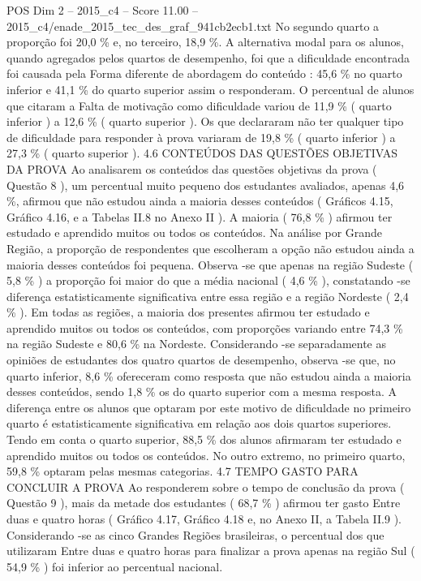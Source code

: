 \begin{textsample}{POS Dim 2 – 2015\_c4 – Score 11.00 – 2015\_c4/enade\_2015\_tec\_des\_graf\_941cb2ecb1.txt}
No segundo quarto a proporção foi 20,0 \% e, no terceiro, 18,9 \%.
A alternativa modal para os alunos, quando agregados pelos quartos de desempenho, foi que a dificuldade encontrada foi causada pela Forma diferente de abordagem do conteúdo : 45,6 \% no quarto inferior e 41,1 \% do quarto superior assim o responderam.
O percentual de alunos que citaram a Falta de motivação como dificuldade variou de 11,9 \% ( quarto inferior ) a 12,6 \% ( quarto superior ).
Os que declararam não ter qualquer tipo de dificuldade para responder à prova variaram de 19,8 \% ( quarto inferior ) a 27,3 \% ( quarto superior ). 4.6 CONTEÚDOS DAS QUESTÕES OBJETIVAS DA PROVA Ao analisarem os conteúdos das questões objetivas da prova ( Questão 8 ), um percentual muito pequeno dos estudantes avaliados, apenas 4,6 \%, afirmou que não estudou ainda a maioria desses conteúdos ( Gráficos 4.15, Gráfico 4.16, e a Tabelas II.8 no Anexo II ).
A maioria ( 76,8 \% ) afirmou ter estudado e aprendido muitos ou todos os conteúdos.
Na análise por Grande Região, a proporção de respondentes que escolheram a opção não estudou ainda a maioria desses conteúdos foi pequena.
Observa -se que apenas na região Sudeste ( 5,8 \% ) a proporção foi maior do que a média nacional ( 4,6 \% ), constatando -se diferença estatisticamente significativa entre essa região e a região Nordeste ( 2,4 \% ).
Em todas as regiões, a maioria dos presentes afirmou ter estudado e aprendido muitos ou todos os conteúdos, com proporções variando entre 74,3 \% na região Sudeste e 80,6 \% na Nordeste.
Considerando -se separadamente as opiniões de estudantes dos quatro quartos de desempenho, observa -se que, no quarto inferior, 8,6 \% ofereceram como resposta que não estudou ainda a maioria desses conteúdos, sendo 1,8 \% os do quarto superior com a mesma resposta.
A diferença entre os alunos que optaram por este motivo de dificuldade no primeiro quarto é estatisticamente significativa em relação aos dois quartos superiores.
Tendo em conta o quarto superior, 88,5 \% dos alunos afirmaram ter estudado e aprendido muitos ou todos os conteúdos.
No outro extremo, no primeiro quarto, 59,8 \% optaram pelas mesmas categorias. 4.7 TEMPO GASTO PARA CONCLUIR A PROVA Ao responderem sobre o tempo de conclusão da prova ( Questão 9 ), mais da metade dos estudantes ( 68,7 \% ) afirmou ter gasto Entre duas e quatro horas ( Gráfico 4.17, Gráfico 4.18 e, no Anexo II, a Tabela II.9 ).
Considerando -se as cinco Grandes Regiões brasileiras, o percentual dos que utilizaram Entre duas e quatro horas para finalizar a prova apenas na região Sul ( 54,9 \% ) foi inferior ao percentual nacional.

\end{textsample}
